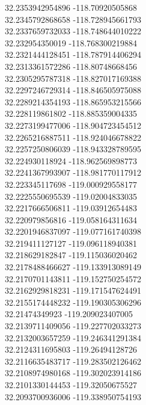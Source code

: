 {32.2353942954896	-118.70920505868\\
32.2345792868658	-118.728945661793\\
32.2337659732033	-118.748644010222\\
32.232954350019	-118.768300219884\\
32.2321444128451	-118.787914406294\\
32.2313361572286	-118.80748668456\\
32.2305295787318	-118.827017169388\\
32.2297246729314	-118.846505975088\\
32.2289214354193	-118.865953215566\\
32.228119861802	-118.885359004335\\
32.2273199477006	-118.904723454512\\
32.2265216887511	-118.924046678822\\
32.2257250806039	-118.943328789595\\
32.224930118924	-118.962569898773\\
32.2241367993907	-118.981770117912\\
32.223345117698	-119.000929558177\\
32.2225550695539	-119.02004833035\\
32.2217666506811	-119.03912654483\\
32.220979856816	-119.058164311634\\
32.2201946837097	-119.077161740398\\
32.219411127127	-119.096118940381\\
32.218629182847	-119.115036020462\\
32.2178488466627	-119.133913089149\\
32.2170701143811	-119.152750254572\\
32.2162929818231	-119.171547624491\\
32.2155174448232	-119.190305306296\\
32.21474349923	-119.209023407005\\
32.2139711409056	-119.227702033273\\
32.2132003657259	-119.246341291384\\
32.2124311695803	-119.26494128726\\
32.2116635483717	-119.283502126462\\
32.2108974980168	-119.302023914186\\
32.2101330144453	-119.32050675527\\
32.2093700936006	-119.338950754193\\
}
